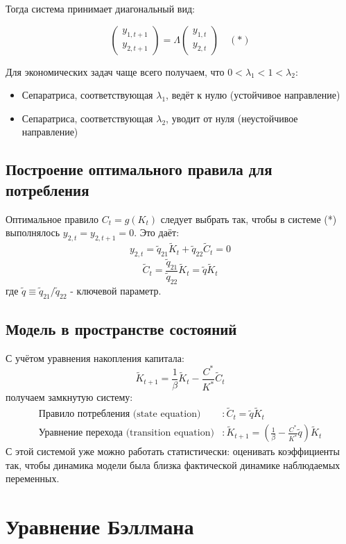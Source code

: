 \documentclass[a4paper,12pt]{article}
\begin{document}
{Тогда система принимает диагональный вид:

\[
\begin{pmatrix}
y_{1,t+1} \\
y_{2,t+1}
\end{pmatrix} 
= \Lambda \begin{pmatrix}
y_{1,t} \\
y_{2,t}
\end{pmatrix} 
\quad (*)
\]

Для экономических задач чаще всего получаем, что $0 < \lambda_1 < 1 < \lambda_2$:
\begin{itemize}
    \item Сепаратриса, соответствующая $\lambda_1$, ведёт к нулю (устойчивое направление)
    \item Сепаратриса, соответствующая $\lambda_2$, уводит от нуля (неустойчивое направление)
\end{itemize}

\subsection{Построение оптимального правила для потребления}
Оптимальное правило $C_t = g(K_t)$ следует выбрать так, чтобы в системе (*) выполнялось $y_{2,t} = y_{2,t+1} = 0$. Это даёт:
\[
y_{2,t} = \tilde{q}_{21}\tilde{K}_t + \tilde{q}_{22}\tilde{C}_t = 0
\]
\[
\tilde{C}_t = \frac{\tilde{q}_{21}}{\tilde{q}_{22}}\tilde{K}_t = \tilde{q}\tilde{K}_t
\]
где $\tilde{q} \equiv \tilde{q}_{21}/\tilde{q}_{22}$ - ключевой параметр.

\subsection{Модель в пространстве состояний}
С учётом уравнения накопления капитала:
\[
\tilde{K}_{t+1} = \frac{1}{\beta}\tilde{K}_t - \frac{C^*}{K^*}\tilde{C}_t
\]
получаем замкнутую систему:
\begin{align*}
\text{Правило потребления (state equation)} &: \tilde{C}_t = \tilde{q}\tilde{K}_t \\
\text{Уравнение перехода (transition equation)} &: \tilde{K}_{t+1} = \left( \frac{1}{\beta} - \frac{C^*}{K^*}\tilde{q} \right)\tilde{K}_t
\end{align*}
С этой системой уже можно работать статистически: оценивать коэффициенты так, чтобы динамика модели была близка
фактической динамике наблюдаемых переменных.

\section{Уравнение Бэллмана}

}
\end{document}
